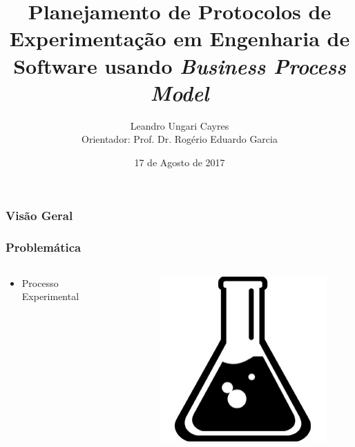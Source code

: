 \documentclass[aspectratio=169]{beamer}
\title[Protocolos de Experimentação]{Planejamento de Protocolos de Experimentação em Engenharia
de Software usando \textit{Business Process Model}}
\author[Leandro Ungari Cayres]{Leandro Ungari Cayres \\Orientador: Prof. Dr. Rogério Eduardo Garcia} %
\institute[UNESP] %
{
Universidade Estadual Paulista \\ %
\medskip
\textit{leandroungari@gmail.com} %
}
\date{17 de Agosto de 2017} %
\begin{document}
\begin{frame}
\titlepage %
\end{frame}

\begin{frame}
\frametitle{Visão Geral}
\tableofcontents
\end{frame}

\begin{frame}
\frametitle{Problemática}
\justifying

\begin{columns}

\begin{column}{0.5\textwidth}
\begin{itemize}
\item Processo Experimental
\end{itemize}
\end{column}

\begin{column}{0.5\textwidth}
\begin{figure}
\centering
\includegraphics[scale=0.35]{images/experimento.jpg}
\end{figure}
\end{column}
\end{columns}




\end{frame}
\end{document}
